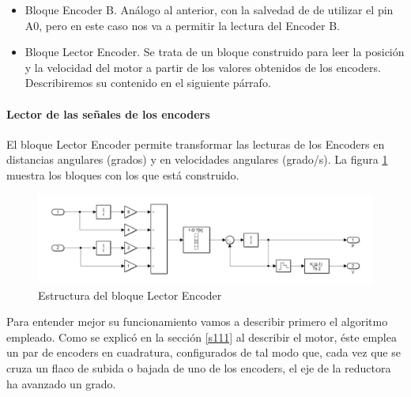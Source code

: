 \documentclass[10pt,a4paper]{report}
\begin{document}
\begin{itemize}
\item Bloque Encoder B. Análogo al anterior, con la salvedad de de utilizar el pin A0, pero en este caso nos va a permitir la lectura del Encoder B.

\item Bloque Lector Encoder. Se trata de un bloque construido para leer la posición y la velocidad del motor a partir de los valores obtenidos de los encoders. Describiremos su contenido en el siguiente párrafo.
\end{itemize}

\paragraph{Lector de las señales de los encoders} El bloque Lector Encoder permite transformar las lecturas de los Encoders en distancias angulares (grados) y en velocidades angulares (grado/s). La figura \ref{f20} muestra los bloques con los que está construido.
\begin{figure}
\includegraphics[width=\textwidth]{la3.jpg}
\caption{Estructura del bloque Lector Encoder}
\label{f20}
\end{figure} 
Para entender mejor su funcionamiento vamos a describir primero el algoritmo empleado. Como se explicó en la sección \ref{s111} al describir el motor, éste emplea un par de encoders en cuadratura, configurados de tal modo que, cada vez que se cruza un flaco de subida o bajada de uno de los encoders, el eje de la reductora ha avanzado un grado.
\end{document}
